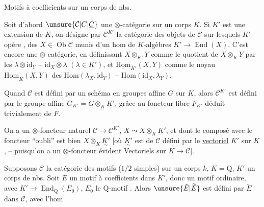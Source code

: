 Motifs à coefficients sur un corps de nbs.

Soit d'abord $\unsure{\mathcal C|C|\underline C}$ une $\otimes$-catégorie sur un corps $K$. Si $K'$ est
une extension  de $K$, on désigne par $\mathcal C^{K'}$ la catégorie des
objets de $\mathcal C$ sur lesquels $K'$ opère , 
des $X\in\operatorname{Ob}\mathcal C$ munis d'un hom de $K$-algèbres
$K'\longrightarrow\operatorname{End}(X)$. C'est encore une $\otimes$-catégorie, en définissant
$X\otimes_{K'}Y$ comme le quotient de $X\otimes_KY$ par les
$\lambda\otimes\mathrm{id}_Y-\mathrm{id}_X\otimes\lambda$ $(\lambda\in K')$, et $\underline{\mathrm{Hom}}_{K'}(X,Y)$ comme le
noyau  $\underline{\mathrm{Hom}}_K(X,Y)$ des $\underline{\mathrm{Hom}}(\lambda_X,\mathrm{id}_Y)-\underline{\mathrm{Hom}}(\mathrm{id}_X,\lambda_Y)$.

Quand $\mathcal C$ est défini par un schéma en groupes
affine $G$ sur $K$, alors $\mathcal C^{K'}$ est défini par
le groupe affine $G_{K'}=G\otimes_K K'$, grâce au foncteur
fibre  $F_{K'}$ déduit trivialement de $F$.

On a un $\otimes$-foncteur naturel $\mathcal C\longrightarrow\mathcal C^{K'}$, 
$X\leadsto X\otimes_K K'$, et dont le composé avec le foncteur
``oubli'' est bien $X\otimes_K\underset{\sim}{K'}$ [où $\underset{\sim}{K'}$ est  
de $\mathcal C$ défini par le \uline{vectoriel} $K'$ sur $K$, -- puisqu'on
a un $\otimes$-foncteur évident Vectoriels  sur $K\longrightarrow\mathcal C$].

Supposons $\mathcal C$ la catégorie des motifs ($1/2$ simples) sur un
corps $k$,  $K=\mathrm Q$, $K'$ un corps de nbs.
Soit $E$ un motif à coefficients dans $K'$, donc
un motif ordinaire, avec $K'\longrightarrow\operatorname{End}_{\mathrm Q}(E_0)$, $E_0$ le $\mathrm Q$-motif .
Alors $\unsure{\check E|\widetilde E}$  est défini par $\widetilde E$ dans $\mathcal C$, avec l'hom
